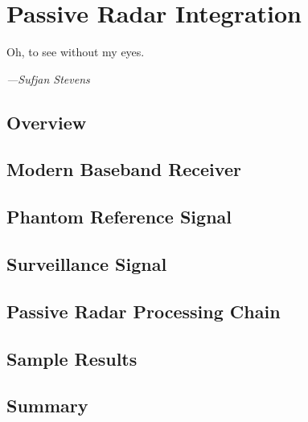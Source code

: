 \documentclass[class=report,11pt,crop=false]{standalone}
\begin{document}
\chapter{Passive Radar Integration}
\epigraph{Oh, to see without my eyes.}%
    {\emph{---Sufjan Stevens}}

\section{Overview}

\section{Modern Baseband Receiver}

\section{Phantom Reference Signal}

\section{Surveillance Signal}

\section{Passive Radar Processing Chain}

\section{Sample Results}


\section{Summary}








\ifstandalone

\printnoidxglossary[type=\acronymtype,nonumberlist]
\fi
\end{document}
